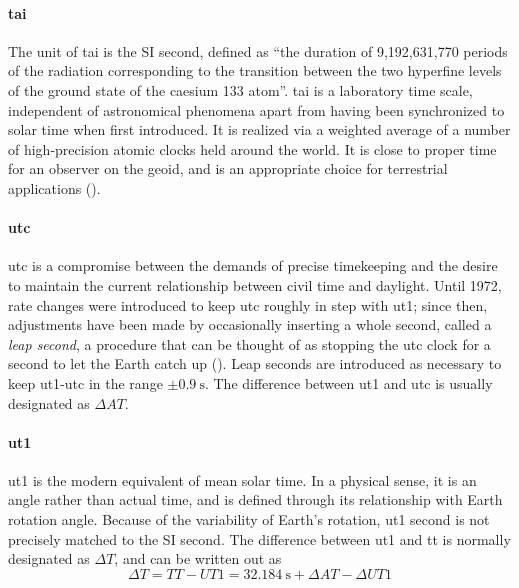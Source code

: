 \paragraph{\gls{tai}}\label{par:tai}
The unit of \gls{tai} is the SI second, defined as ``the duration of 9,192,631,770 periods 
of the radiation corresponding to the transition between the two hyperfine levels of the ground state 
of the caesium 133 atom''. \gls{tai} is a laboratory time scale, independent of 
astronomical phenomena apart from having been synchronized to solar time when first 
introduced. It is realized via a weighted average of a number of high-precision atomic 
clocks held around the world. It is close to proper time for an observer on the
geoid, and is an appropriate choice for terrestrial applications (\cite{sofa2021ts}).

\paragraph{\gls{utc}}\label{par:utc}
\gls{utc} is a compromise between the demands of precise timekeeping and the desire to maintain
the current relationship between civil time and daylight. Until 1972, rate changes were 
introduced to keep \gls{utc} roughly in step with \gls{ut1}; since then, adjustments have been 
made by occasionally inserting a whole second, called a \emph{leap second}, a procedure 
that can be thought of as stopping the \gls{utc} clock for a second to let the Earth catch 
up (\cite{sofa2021ts}). Leap seconds are introduced as necessary to keep \gls{ut1}-\gls{utc} in the
range $\pm\SI{0.9}{\second}$. The difference between \gls{ut1} and \gls{utc} is usually 
designated as $\Delta AT$.

\paragraph{\gls{ut1}}\label{par:ut1}
\gls{ut1} is the modern equivalent of mean solar time. In a physical sense, it is an 
angle rather than actual time, and is defined through its relationship with Earth 
rotation angle. Because of the variability of Earth's rotation, \gls{ut1} second is not 
precisely matched to the SI second. The difference between \gls{ut1} and \gls{tt} 
is normally designated as $\Delta T$, and can be written out as
\begin{equation}
    \Delta T = TT - UT1 = \SI{32.184}{\second} + \Delta AT - \Delta UT1
\end{equation}

